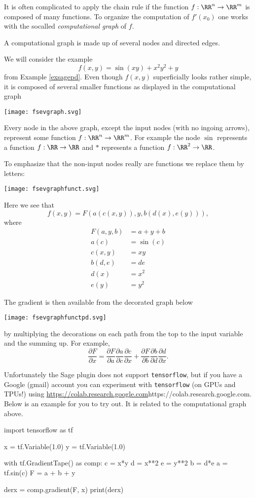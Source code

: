 \documentclass{article}
\newcommand{\pd}[2]{\frac{\partial #1}{\partial #2}}
\begin{document}
\begin{example}
  
It is often complicated to apply the chain rule if the
function $f:\RR^n\rightarrow \RR^m$ is composed of many
functions. To organize the computation of $f'(x_0)$ one
works with the socalled \emph{computational graph} of $f$.

A computational graph is made up of several nodes and directed edges.



We will consider the example
$$
f(x, y) =   \sin(x y) + x^2 y^2 + y
$$
from Example \ref{exsagepd}. Even though $f(x, y)$ superficially looks rather simple,
it is composed of several smaller functions as displayed in the computational graph

\texttt{[image: fsevgraph.svg]}

Every node in the above graph, except the input nodes (with no ingoing arrows),
represent some function $f:\RR^n\rightarrow \RR^m$. For example the node
$\sin$ represents a function $f: \RR\rightarrow \RR$ and $*$ represents
a function $f: \RR^2\rightarrow \RR$.

To emphasize that the non-input nodes really are functions we replace them by letters:

\texttt{[image: fsevgraphfunct.svg]}

Here we see that 
$$
f(x, y) = F(a(c(x, y)), y, b(d(x), e(y))), 
$$
where
\begin{align*}
  F(a, y, b) &= a + y + b\\
  a(c) &= \sin(c)\\
  c(x, y) &= x y\\
  b(d, e) &= d e\\
  d(x) &= x^2\\
  e(y) &= y^2
\end{align*}


The gradient is then available from the decorated graph below

\texttt{[image: fsevgraphfunctpd.svg]}

by multiplying the decorations on each path from the top to the input variable and the summing up. For example,
$$
\pd{F}{x} = \pd{F}{a} \pd{a}{c} \pd{c}{x} + \pd{F}{b} \pd{b}{d} \pd{d}{x}.
$$

  Unfortunately the Sage plugin does not support \texttt{tensorflow}, but if you have a
  Google (gmail) account you can experiment with \texttt{tensorflow} (on GPUs and TPUs!) using \url{https://colab.research.google.com}{https://colab.research.google.com}. Below is an example for you to try out. It is related to the computational graph above.
  \begin{code}
import tensorflow as tf

x = tf.Variable(1.0)
y = tf.Variable(1.0)

with tf.GradientTape() as comp:
   c = x*y
   d = x**2
   e = y**2
   b = d*e
   a = tf.sin(c)
   F = a + b + y

derx = comp.gradient(F, x)
print(derx)   
\end{code}
\end{example}
\end{document}
